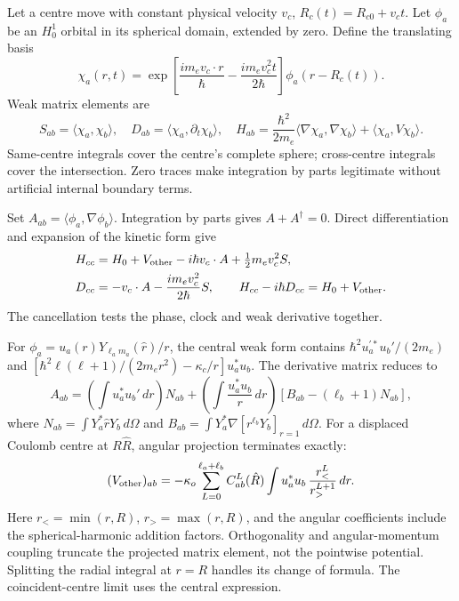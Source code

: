 Let a centre move with constant physical velocity $v_c$, $R_c(t)=R_{c0}+v_ct$. Let $\phi_a$ be an $H^1_0$ orbital in its spherical domain, extended by zero. Define the translating basis
\begin{equation}
 \chi_a(r,t)=
 \exp\!\left[\frac{im_ev_c\cdot r}{\hbar}
 -\frac{im_ev_c^2t}{2\hbar}\right]\phi_a(r-R_c(t)).
 \label{v:galilean_basis}
\end{equation}
Weak matrix elements are
\begin{equation}
 S_{ab}=\langle\chi_a,\chi_b\rangle,\quad
 D_{ab}=\langle\chi_a,\partial_t\chi_b\rangle,\quad
 H_{ab}=\frac{\hbar^2}{2m_e}\langle\nabla\chi_a,\nabla\chi_b\rangle+
 \langle\chi_a,V\chi_b\rangle .
 \label{v:weak_atomic}
\end{equation}
Same-centre integrals cover the centre's complete sphere; cross-centre integrals cover the intersection. Zero traces make integration by parts legitimate without artificial internal boundary terms.

Set $A_{ab}=\langle\phi_a,\nabla\phi_b\rangle$. Integration by parts gives $A+A^\dagger=0$. Direct differentiation and expansion of the kinetic form give
\begin{align}
 H_{cc}&=H_0+V_{\rm other}-i\hbar v_c\cdot A+
 \tfrac12m_ev_c^2S,\nonumber\\
 D_{cc}&=-v_c\cdot A-\frac{im_ev_c^2}{2\hbar}S,\qquad
 H_{cc}-i\hbar D_{cc}=H_0+V_{\rm other}.
 \label{v:translation_cancellation}
\end{align}
The cancellation tests the phase, clock and weak derivative together.

For $\phi_a=u_a(r)Y_{\ell_am_a}(\hat r)/r$, the central weak form contains
$\hbar^2u_a^{\prime *}u_b'/(2m_e)$ and
$[\hbar^2\ell(\ell+1)/(2m_er^2)-\kappa_c/r]u_a^*u_b$.
The derivative matrix reduces to
\begin{equation}
 A_{ab}=\left(\int u_a^*u_b'\,dr\right)N_{ab}
 +\left(\int\frac{u_a^*u_b}{r}\,dr\right)
 [B_{ab}-(\ell_b+1)N_{ab}],
 \label{v:radial_derivative}
\end{equation}
where $N_{ab}=\int Y_a^*\hat rY_b\,d\Omega$ and
$B_{ab}=\int Y_a^*\nabla[r^{\ell_b}Y_b]_{r=1}\,d\Omega$.
For a displaced Coulomb centre at $R\hat R$, angular projection terminates exactly:
\begin{equation}
 (V_{\rm other})_{ab}=-\kappa_o
 \sum_{L=0}^{\ell_a+\ell_b}C^L_{ab}(\hat R)
 \int u_a^*u_b\,\frac{r_<^L}{r_>^{L+1}}\,dr .
 \label{v:coulomb_projection}
\end{equation}
Here $r_<=\min(r,R)$, $r_>=\max(r,R)$, and the angular coefficients include the spherical-harmonic addition factors. Orthogonality and angular-momentum coupling truncate the projected matrix element, not the pointwise potential. Splitting the radial integral at $r=R$ handles its change of formula. The coincident-centre limit uses the central expression.

